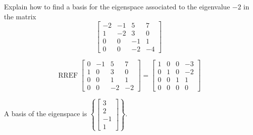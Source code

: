 
\begin{exerciseStatement}


Explain how to find a basis for the eigenspace associated to the eigenvalue \( -2 \) in the matrix \[ \left[\begin{array}{cccc}
-2 & -1 & 5 & 7 \\
1 & -2 & 3 & 0 \\
0 & 0 & -1 & 1 \\
0 & 0 & -2 & -4
\end{array}\right] \]


\end{exerciseStatement}
    
\begin{exerciseAnswer} 


\[\operatorname{RREF} \left[\begin{array}{cccc}
0 & -1 & 5 & 7 \\
1 & 0 & 3 & 0 \\
0 & 0 & 1 & 1 \\
0 & 0 & -2 & -2
\end{array}\right] = \left[\begin{array}{cccc}
1 & 0 & 0 & -3 \\
0 & 1 & 0 & -2 \\
0 & 0 & 1 & 1 \\
0 & 0 & 0 & 0
\end{array}\right] \]



A basis of the eigenspace is \( \left\{ \left[\begin{array}{c}
3 \\
2 \\
-1 \\
1
\end{array}\right] \right\} \).


\end{exerciseAnswer}
    
